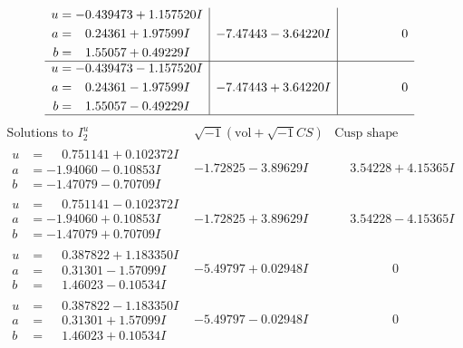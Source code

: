 \documentclass[1p]{elsarticle_modified}
\theoremstyle{definition}
\newcommand{\I}{\sqrt{-1}}
\begin{document}
$$\begin{array}{c|c|c}
\begin{aligned}
u &= -0.439473 + 1.157520 I \\
a &= \phantom{-}0.24361 + 1.97599 I \\
b &= \phantom{-}1.55057 + 0.49229 I\end{aligned}
 & -7.47443 - 3.64220 I & \phantom{-0.000000 } 0 \\ \hline\begin{aligned}
u &= -0.439473 - 1.157520 I \\
a &= \phantom{-}0.24361 - 1.97599 I \\
b &= \phantom{-}1.55057 - 0.49229 I\end{aligned}
 & -7.47443 + 3.64220 I & \phantom{-0.000000 } 0\\
 \hline 
 \end{array}$$\newpage$$\begin{array}{c|c|c}  
\text{Solutions to }I^u_{2}& \I (\text{vol} + \sqrt{-1}CS) & \text{Cusp shape}\\
 \hline 
\begin{aligned}
u &= \phantom{-}0.751141 + 0.102372 I \\
a &= -1.94060 - 0.10853 I \\
b &= -1.47079 - 0.70709 I\end{aligned}
 & -1.72825 - 3.89629 I & \phantom{-}3.54228 + 4.15365 I \\ \hline\begin{aligned}
u &= \phantom{-}0.751141 - 0.102372 I \\
a &= -1.94060 + 0.10853 I \\
b &= -1.47079 + 0.70709 I\end{aligned}
 & -1.72825 + 3.89629 I & \phantom{-}3.54228 - 4.15365 I \\ \hline\begin{aligned}
u &= \phantom{-}0.387822 + 1.183350 I \\
a &= \phantom{-}0.31301 - 1.57099 I \\
b &= \phantom{-}1.46023 - 0.10534 I\end{aligned}
 & -5.49797 + 0.02948 I & \phantom{-0.000000 } 0 \\ \hline\begin{aligned}
u &= \phantom{-}0.387822 - 1.183350 I \\
a &= \phantom{-}0.31301 + 1.57099 I \\
b &= \phantom{-}1.46023 + 0.10534 I\end{aligned}
 & -5.49797 - 0.02948 I & \phantom{-0.000000 } 0 \\ \hline\begin{aligned}

\end{aligned}
\end{array}$$
\end{document}
